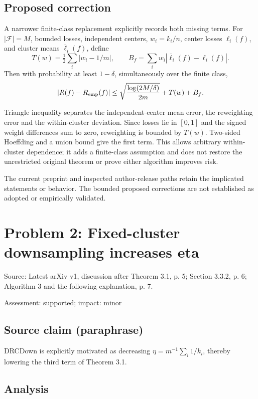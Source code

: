 \documentclass[11pt]{article}
\begin{document}
\subsection*{Proposed correction}

A narrower finite-class replacement explicitly records both missing terms. For \(|\mathcal F|=M\), bounded losses, independent centers, \(w_i=k_i/n\), center losses \(\ell_i(f)\), and cluster means \(\bar\ell_i(f)\), define \[T(w)=\tfrac12\sum_i|w_i-1/m|,\qquad B_f=\sum_iw_i|\bar\ell_i(f)-\ell_i(f)|.\] Then with probability at least \(1-\delta\), simultaneously over the finite class, \[|R(f)-R_{\rm emp}(f)|\le\sqrt{\frac{\log(2M/\delta)}{2m}}+T(w)+B_f.\]

Triangle inequality separates the independent-center mean error, the reweighting error and the within-cluster deviation. Since losses lie in \([0,1]\) and the signed weight differences sum to zero, reweighting is bounded by \(T(w)\). Two-sided Hoeffding and a union bound give the first term. This allows arbitrary within-cluster dependence; it adds a finite-class assumption and does not restore the unrestricted original theorem or prove either algorithm improves risk.

The current preprint and inspected author-release paths retain the implicated statements or behavior. The bounded proposed corrections are not established as adopted or empirically validated.

\section*{Problem 2: Fixed-cluster downsampling increases eta}

Source: Latest arXiv v1, discussion after Theorem 3.1, p. 5; Section 3.3.2, p. 6; Algorithm 3 and the following explanation, p. 7.

Assessment: supported; impact: minor

\subsection*{Source claim (paraphrase)}

DRCDown is explicitly motivated as decreasing \(\eta=m^{-1}\sum_i1/k_i\), thereby lowering the third term of Theorem 3.1.

\subsection*{Analysis}
\end{document}
